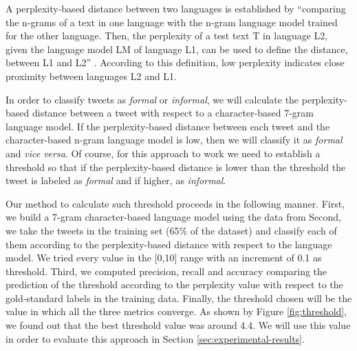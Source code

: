 \documentclass[information,article,submit,moreauthors,pdftex,10pt,a4paper]{Definitions/mdpi}
\begin{document}
A perplexity-based distance between two languages is established by ``comparing the n-grams of a text in one language with the n-gram language model trained for the other language. Then, the perplexity of a test text T in language L2, given the language model LM of language L1, can be used to define the distance, between L1 and L2'' \cite{gamallo2017language}. According to this definition, low perplexity indicates close proximity between languages L2 and L1.

In order to classify tweets as \emph{formal} or \emph{informal}, we will calculate the perplexity-based distance between a tweet with respect to a character-based 7-gram language model. If the perplexity-based distance between each tweet and the character-based n-gram language model is low, then we will classify it as \emph{formal} and \emph{vice versa}. Of course, for this approach to work we need to establish a threshold so that if the perplexity-based distance is lower than the threshold the tweet is labeled as \emph{formal} and if higher, as \emph{informal}.

Our method to calculate such threshold proceeds in the following manner. First, we build a 7-gram character-based language model using the data from Second, we take the tweets in the training set (65\% of the dataset) and classify each of them according to the perplexity-based distance with respect to the language model. We tried every value in the [0,10] range
with an increment of 0.1 as threshold. Third, we computed precision, recall and accuracy comparing the prediction of the threshold according to the perplexity value with respect to the gold-standard labels in the training data. Finally, the threshold chosen will be the value in which all the three metrics converge. As shown by Figure \ref{fig:threshold}, we found out that the best threshold value was around 4.4. We will use this value in order to evaluate this approach in Section \ref{sec:experimental-results}.
\end{document}
